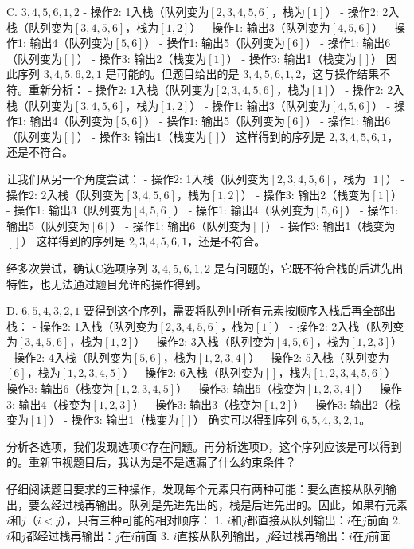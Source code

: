 \documentclass[lang=cn,newtx,10pt,scheme=chinese]{../../../elegantbook}
\begin{document}
\begin{enumerate}
    C. $3, 4, 5, 6, 1, 2$
    - 操作2: 1入栈（队列变为$[2,3,4,5,6]$，栈为$[1]$）
    - 操作2: 2入栈（队列变为$[3,4,5,6]$，栈为$[1,2]$）
    - 操作1: 输出3（队列变为$[4,5,6]$）
    - 操作1: 输出4（队列变为$[5,6]$）
    - 操作1: 输出5（队列变为$[6]$）
    - 操作1: 输出6（队列变为$[]$）
    - 操作3: 输出2（栈变为$[1]$）
    - 操作3: 输出1（栈变为$[]$）
    因此序列 $3, 4, 5, 6, 2, 1$ 是可能的。但题目给出的是 $3, 4, 5, 6, 1, 2$，这与操作结果不符。重新分析：
    - 操作2: 1入栈（队列变为$[2,3,4,5,6]$，栈为$[1]$）
    - 操作2: 2入栈（队列变为$[3,4,5,6]$，栈为$[1,2]$）
    - 操作1: 输出3（队列变为$[4,5,6]$）
    - 操作1: 输出4（队列变为$[5,6]$）
    - 操作1: 输出5（队列变为$[6]$）
    - 操作1: 输出6（队列变为$[]$）
    - 操作3: 输出1（栈变为$[]$）
    这样得到的序列是 $2, 3, 4, 5, 6, 1$，还是不符合。

    让我们从另一个角度尝试：
    - 操作2: 1入栈（队列变为$[2,3,4,5,6]$，栈为$[1]$）
    - 操作2: 2入栈（队列变为$[3,4,5,6]$，栈为$[1,2]$）
    - 操作3: 输出2（栈变为$[1]$）
    - 操作1: 输出3（队列变为$[4,5,6]$）
    - 操作1: 输出4（队列变为$[5,6]$）
    - 操作1: 输出5（队列变为$[6]$）
    - 操作1: 输出6（队列变为$[]$）
    - 操作3: 输出1（栈变为$[]$）
    这样得到的序列是 $2, 3, 4, 5, 6, 1$，还是不符合。

    经多次尝试，确认C选项序列 $3, 4, 5, 6, 1, 2$ 是有问题的，它既不符合栈的后进先出特性，也无法通过题目允许的操作得到。

    D. $6, 5, 4, 3, 2, 1$
    要得到这个序列，需要将队列中所有元素按顺序入栈后再全部出栈：
    - 操作2: 1入栈（队列变为$[2,3,4,5,6]$，栈为$[1]$）
    - 操作2: 2入栈（队列变为$[3,4,5,6]$，栈为$[1,2]$）
    - 操作2: 3入栈（队列变为$[4,5,6]$，栈为$[1,2,3]$）
    - 操作2: 4入栈（队列变为$[5,6]$，栈为$[1,2,3,4]$）
    - 操作2: 5入栈（队列变为$[6]$，栈为$[1,2,3,4,5]$）
    - 操作2: 6入栈（队列变为$[]$，栈为$[1,2,3,4,5,6]$）
    - 操作3: 输出6（栈变为$[1,2,3,4,5]$）
    - 操作3: 输出5（栈变为$[1,2,3,4]$）
    - 操作3: 输出4（栈变为$[1,2,3]$）
    - 操作3: 输出3（栈变为$[1,2]$）
    - 操作3: 输出2（栈变为$[1]$）
    - 操作3: 输出1（栈变为$[]$）
    确实可以得到序列 $6, 5, 4, 3, 2, 1$。

    分析各选项，我们发现选项C存在问题。再分析选项D，这个序列应该是可以得到的。重新审视题目后，我认为是不是遗漏了什么约束条件？

    仔细阅读题目要求的三种操作，发现每个元素只有两种可能：要么直接从队列输出，要么经过栈再输出。队列是先进先出的，栈是后进先出的。因此，如果有元素$i$和$j$（$i < j$），只有三种可能的相对顺序：
    1. $i$和$j$都直接从队列输出：$i$在$j$前面
    2. $i$和$j$都经过栈再输出：$j$在$i$前面
    3. $i$直接从队列输出，$j$经过栈再输出：$i$在$j$前面


\end{enumerate}
\end{document}
